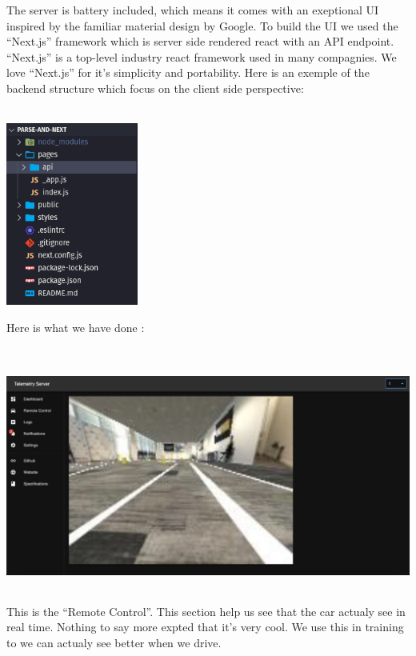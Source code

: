 \documentclass[12pt]{article}
\begin{document}
The server is battery included, which means it comes with an exeptional UI inspired by the familiar material design by Google. To build the UI we used the “Next.js” framework which is server side rendered react with an API endpoint. “Next.js” is a top-level industry react framework used in many compagnies. We love “Next.js” for it’s simplicity and portability. Here is an exemple of the backend structure which focus on the client side perspective: \\ \\
\centerline{\includegraphics[height=6cm]{../../docs/server-struct.png}}

\newpage

Here is what we have done : \\ \\
\centerline{\includegraphics[height=7.5cm]{../../docs/remote-control.png}}
This is the “Remote Control”. This section help us see that the car actualy see in real time. Nothing to say more expted that it’s very cool. We use this in training to we can actualy see better when we drive. \\
\end{document}
